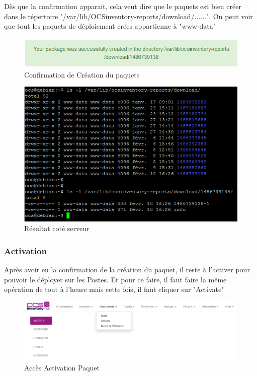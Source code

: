 \documentclass[11pt,a4paper,oneside]{article}
\begin{document}
Dès que la confirmation apparait, cela veut dire que le paquets est bien créer dans le répertoire "/var/lib/OCSinventory-reports/download/......". On peut voir que tout les paquets de déploiement crées appartienne à "www-data"

\begin{figure}[hbtp]
\centering
\includegraphics[scale=0.6]{Script/Deploiement4.PNG}
\caption{Confirmation de Création du paquets}
\end{figure}

\begin{figure}[hbtp]
\centering
\includegraphics[scale=0.7]{Script/Deploiement5.PNG}
\caption{Résultat coté serveur}
\end{figure}
\newpage
\subsubsection{Activation}

Après avoir eu la confirmation de la création du paquet, il reste à l'activer pour pouvoir le déployer sur les Postes. Et pour ce faire, il faut faire la même opération de tout à l'heure mais cette fois, il faut cliquer sur "Activate"

\begin{figure}[hbtp]
\centering
\includegraphics[scale=0.7]{Script/Deploiement1.PNG}
\caption{Accès Activation Paquet}
\end{figure}
\end{document}
